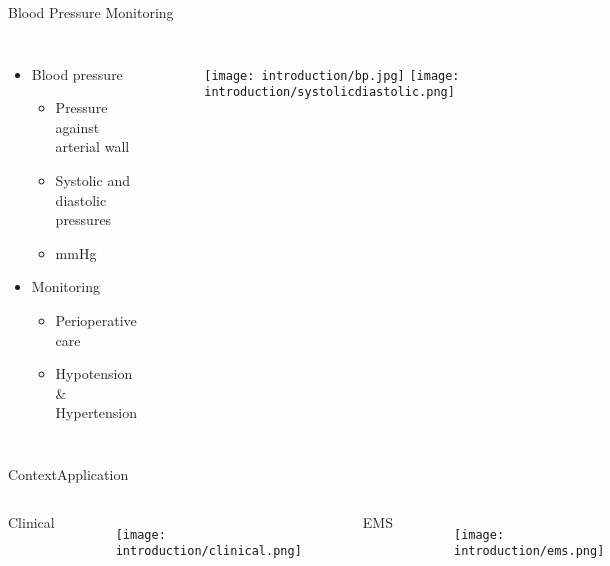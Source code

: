 \begin{frame}{Blood Pressure Monitoring}
    \begin{columns}
        \begin{itemize}

            \item Blood pressure
                  \begin{itemize}
                      \item Pressure against arterial wall
                      \item Systolic and diastolic pressures
                      \item mmHg
                  \end{itemize}


            \item Monitoring
                  \begin{itemize}
                      \item Perioperative care
                      \item Hypotension \& Hypertension
                  \end{itemize}
        \end{itemize}

        \begin{figure}
            \centering
            \texttt{[image: introduction/bp.jpg]}
            \texttt{[image: introduction/systolicdiastolic.png]}
        \end{figure}
    \end{columns}


\end{frame}

\begin{frame}{Context}{Application}
    \begin{columns}
        \centering
        Clinical
        \begin{figure}
            \centering
            \texttt{[image: introduction/clinical.png]}
        \end{figure}

        \centering
        EMS
        \begin{figure}
            \centering
            \texttt{[image: introduction/ems.png]}
        \end{figure}
    \end{columns}
\end{frame}

